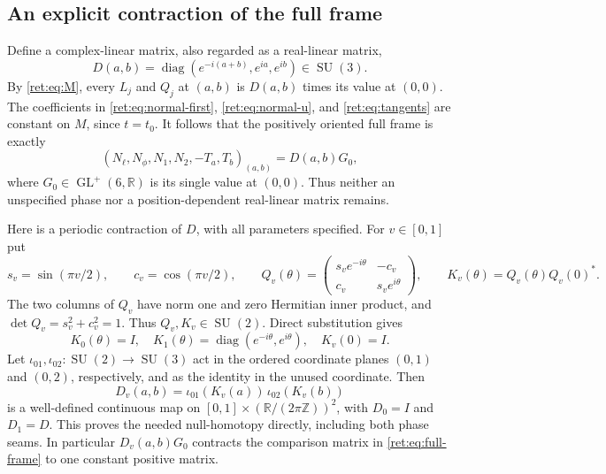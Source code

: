 \documentclass[11pt,letterpaper]{article}
\numberwithin{equation}{section}
\theoremstyle{definition}
\theoremstyle{remark}
\begin{document}
\subsection{An explicit contraction of the full frame}

Define a complex-linear matrix, also regarded as a real-linear matrix,
\begin{equation}
 D(a,b)=\operatorname{diag}(e^{-i(a+b)},e^{ia},e^{ib})\in\operatorname{SU}(3).
 \label{ret:eq:D}
\end{equation}
By \eqref{ret:eq:M}, every \(L_j\) and \(Q_j\) at \((a,b)\) is
\(D(a,b)\) times its value at \((0,0)\).  The coefficients in
\eqref{ret:eq:normal-first}, \eqref{ret:eq:normal-u}, and
\eqref{ret:eq:tangents} are constant on \(M\), since \(t=t_0\).
It follows that the positively oriented full frame is exactly
\begin{equation}
 (N_\ell,N_\phi,N_1,N_2,-T_a,T_b)_{(a,b)}
       =D(a,b)G_0,
 \label{ret:eq:full-frame}
\end{equation}
where \(G_0\in\operatorname{GL}^+(6,\mathbb R)\) is its single value at \((0,0)\).
Thus neither an unspecified phase nor a position-dependent
real-linear matrix remains.

Here is a periodic contraction of \(D\), with all parameters
specified.  For \(v\in[0,1]\) put
\[
 s_v=\sin(\pi v/2),\qquad c_v=\cos(\pi v/2),\qquad
 Q_v(\theta)=
 \begin{pmatrix}s_ve^{-i\theta}&-c_v\\c_v&s_ve^{i\theta}\end{pmatrix},
 \qquad K_v(\theta)=Q_v(\theta)Q_v(0)^*.
\]
The two columns of \(Q_v\) have norm one and zero Hermitian inner
product, and \(\det Q_v=s_v^2+c_v^2=1\).  Thus
\(Q_v,K_v\in\operatorname{SU}(2)\).  Direct substitution gives
\[
 K_0(\theta)=I,\quad
 K_1(\theta)=\operatorname{diag}(e^{-i\theta},e^{i\theta}),\quad
 K_v(0)=I.
\]
Let \(\iota_{01},\iota_{02}:\operatorname{SU}(2)\to\operatorname{SU}(3)\) act in the
ordered coordinate planes \((0,1)\) and \((0,2)\), respectively,
and as the identity in the unused coordinate.  Then
\begin{equation}
 D_v(a,b)=\iota_{01}(K_v(a))\,\iota_{02}(K_v(b))
 \label{ret:eq:D-homotopy}
\end{equation}
is a well-defined continuous map on
\([0,1]\times(\mathbb R/(2\pi\mathbb Z))^2\), with
\(D_0=I\) and \(D_1=D\).  This proves the needed null-homotopy
directly, including both phase seams.  In particular
\(D_v(a,b)G_0\) contracts the comparison matrix in
\eqref{ret:eq:full-frame} to one constant positive matrix.
\end{document}

